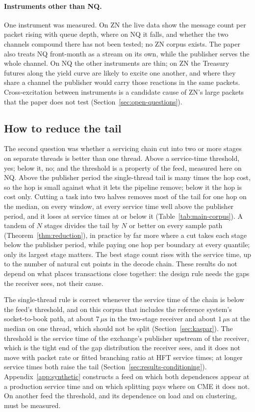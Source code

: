 \documentclass[11pt]{article}
\begin{document}
\paragraph{Instruments other than NQ.} One instrument was measured. On ZN the live data
show the message count per packet rising with queue depth, where on NQ it falls, and
whether the two channels compound there has not been tested; no ZN corpus exists. The
paper also treats NQ front-month as a stream on its own, while the publisher serves the
whole channel. On NQ the other instruments are thin; on ZN the Treasury futures along the
yield curve are likely to excite one another, and where they share a channel the publisher
would carry those reactions in the same packets. Cross-excitation between instruments is
a candidate cause of ZN's large packets that the paper does not test
(Section~\ref{sec:open-questions}).

\subsection{How to reduce the tail}
\label{sec:concl-mitigate}

The second question was whether a servicing chain cut into two or more stages on separate
threads is better than one thread. Above a service-time threshold, yes; below it, no; and
the threshold is a property of the feed, measured here on NQ. Above the publisher period
the single-thread tail is many times the hop cost, so the hop is small against what it
lets the pipeline remove; below it the hop is cost only. Cutting a task into two halves
removes most of the tail for one hop on the median, on every window, at every service time well above the publisher period, and it loses at service times at or below it
(Table~\ref{tab:main-corpus}). A tandem of $N$ stages divides the tail by $N$ or better on
every sample path (Theorem~\ref{thm:reduction}), in practice by far more where a cut takes
each stage below the publisher period, while paying one hop per boundary at every
quantile; only its largest stage matters. The best stage count rises with the service
time, up to the number of natural cut points in the decode chain. These results do not
depend on what places transactions close together: the design rule needs the gaps the
receiver sees, not their cause.

The single-thread rule is correct whenever the service time of the chain is below the
feed's threshold, and on this corpus that includes the reference system's socket-to-book
path, at about $7\,\mu\mathrm{s}$ in the two-stage receiver and about $1\,\mu\mathrm{s}$ at the
median on one thread, which should not be split (Section~\ref{sec:kaspar}).
The threshold is the service time of the exchange's publisher upstream of the receiver,
which is the tight end of the gap distribution the receiver sees, and it does not move
with packet rate or fitted branching ratio at HFT service times; at longer service times
both raise the tail (Section~\ref{sec:results-conditioning}).
Appendix~\ref{app:synthetic} constructs a feed on which both dependences appear at a
production service time and on which splitting pays where on CME it does not. On another
feed the threshold, and its dependence on load and on clustering, must be measured.
\end{document}
